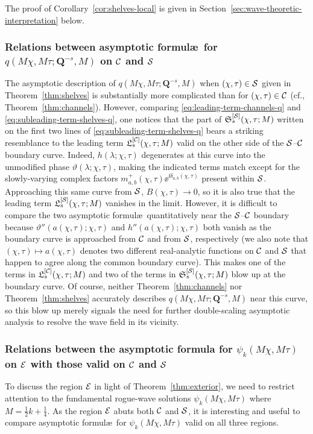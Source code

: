 The proof of Corollary~\ref{cor:shelves-local} is given in Section~\ref{sec:wave-theoretic-interpretation} below.

\subsubsection{Relations between asymptotic formul\ae\ for $q(M\chi,M\tau;\mathbf{Q}^{-s},M)$ on $\mathcal{C}$ and $\mathcal{S}$}
The asymptotic description of $q(M\chi,M\tau;\mathbf{Q}^{-s},M)$ when $(\chi,\tau)\in\mathcal{S}$ given in Theorem~\ref{thm:shelves} is substantially more complicated than for $(\chi,\tau)\in\mathcal{C}$ (cf., Theorem~\ref{thm:channels}). 
However, comparing \eqref{eq:leading-term-channels-q} and \eqref{eq:subleading-term-shelves-q}, one notices that the part of $\mathfrak{S}_s^{[\mathcal{S}]}(\chi,\tau;M)$ written on the first two lines of \eqref{eq:subleading-term-shelves-q} bears a striking resemblance to the leading term $\mathfrak{L}_s^{[\mathcal{C}]}(\chi,\tau;M)$ valid on the other side of the $\mathcal{S}$--$\mathcal{C}$ boundary curve.  Indeed, $h(\lambda;\chi,\tau)$ degenerates at this curve into the unmodified phase $\vartheta(\lambda;\chi,\tau)$, making the indicated terms match except for the slowly-varying complex factors $m_{a,b}^+(\chi,\tau)\ee^{\ii\delta_{a,b}(\chi,\tau)}$ present within $\mathcal{S}$.  Approaching this same curve from $\mathcal{S}$, $B(\chi,\tau)\to 0$, so it is also true that the leading term $\mathfrak{L}_s^{[\mathcal{S}]}(\chi,\tau;M)$ vanishes in the limit.  However, it is difficult to compare the two asymptotic formul\ae\ quantitatively near the $\mathcal{S}$--$\mathcal{C}$ boundary because $\vartheta''(a(\chi,\tau);\chi,\tau)$ and $h''(a(\chi,\tau);\chi,\tau)$ both vanish as the boundary curve is approached from $\mathcal{C}$ and from $\mathcal{S}$, respectively (we also note that $(\chi,\tau)\mapsto a(\chi,\tau)$ denotes two different real-analytic functions on $\mathcal{C}$ and $\mathcal{S}$ that happen to agree along the common boundary curve).  This makes one of the terms in $\mathfrak{L}^{[\mathcal{C}]}_s(\chi,\tau;M)$ and two of the terms in $\mathfrak{S}^{[\mathcal{S}]}_s(\chi,\tau;M)$ blow up at the boundary curve.  Of course, neither Theorem~\ref{thm:channels} nor Theorem~\ref{thm:shelves} accurately describes $q(M\chi,M\tau;\mathbf{Q}^{-s},M)$ near this curve, so this blow up merely signals the need for further double-scaling asymptotic analysis to resolve the wave field in its vicinity.

\subsubsection{Relations between the asymptotic formula for $\psi_k(M\chi,M\tau)$ on $\mathcal{E}$ with those valid on $\mathcal{C}$ and $\mathcal{S}$}
To discuss the region $\mathcal{E}$ in light of Theorem~\ref{thm:exterior}, we need to restrict attention to the fundamental rogue-wave solutions $\psi_k(M\chi,M\tau)$ where $M=\tfrac{1}{2}k+\tfrac{1}{4}$.  As the region $\mathcal{E}$ abuts both $\mathcal{C}$ and $\mathcal{S}$, it is interesting and useful to compare asymptotic formul\ae\ for $\psi_k(M\chi,M\tau)$ valid on all three regions.  


